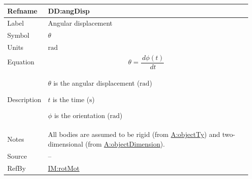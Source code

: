 \documentclass[12pt]{article}
\begin{document}
\vspace{\baselineskip}
\noindent
\begin{minipage}{\textwidth}
\begin{tabular}{>{\raggedright}p{}>{\raggedright\arraybackslash}p{}}
\toprule \textbf{Refname} & \textbf{DD:angDisp}
\label{DD:angDisp}
\\ \midrule
Label & Angular displacement
        
\\ \midrule
Symbol & $θ$
         
\\ \midrule
Units & ${\text{rad}}$
        
\\ \midrule
Equation & \begin{displaymath}
           θ=\frac{\,dϕ\left(t\right)}{\,dt}
           \end{displaymath}
\\ \midrule
Description & \begin{symbDescription}
              \item{$θ$ is the angular displacement (${\text{rad}}$)}
              \item{$t$ is the time (${\text{s}}$)}
              \item{$ϕ$ is the orientation (${\text{rad}}$)}
              \end{symbDescription}
\\ \midrule
Notes & All bodies are assumed to be rigid (from \hyperref[assumpOT]{A:objectTy}) and two-dimensional (from \hyperref[assumpOD]{A:objectDimension}).
        
\\ \midrule
Source & --
         
\\ \midrule
RefBy & \hyperref[IM:rotMot]{IM:rotMot}
        
\\ \bottomrule
\end{tabular}
\end{minipage}
\end{document}
